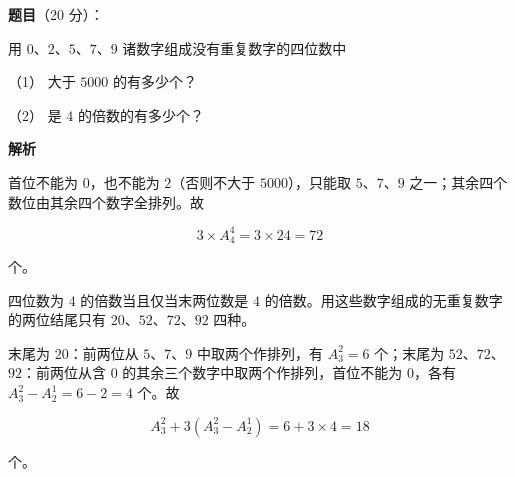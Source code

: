 \begin{answer}

\textbf{题目}（20 分）：

用 $0$、$2$、$5$、$7$、$9$ 诸数字组成没有重复数字的四位数中

（1） 大于 $5000$ 的有多少个？

（2） 是 $4$ 的倍数的有多少个？

\textbf{解析}


首位不能为 $0$，也不能为 $2$（否则不大于 $5000$），只能取 $5$、$7$、$9$ 之一；其余四个数位由其余四个数字全排列。故

\nopagebreak[4]
\[
3\times A_4^4=3\times24=72
\]

个。


四位数为 $4$ 的倍数当且仅当末两位数是 $4$ 的倍数。用这些数字组成的无重复数字的两位结尾只有 $20$、$52$、$72$、$92$ 四种。

末尾为 $20$：前两位从 $5$、$7$、$9$ 中取两个作排列，有 $A_3^2=6$ 个；末尾为 $52$、$72$、$92$：前两位从含 $0$ 的其余三个数字中取两个作排列，首位不能为 $0$，各有 $A_3^2-A_2^1=6-2=4$ 个。故

\nopagebreak[4]
\[
A_3^2+3\left(A_3^2-A_2^1\right)=6+3\times4=18
\]

个。



\end{answer}
